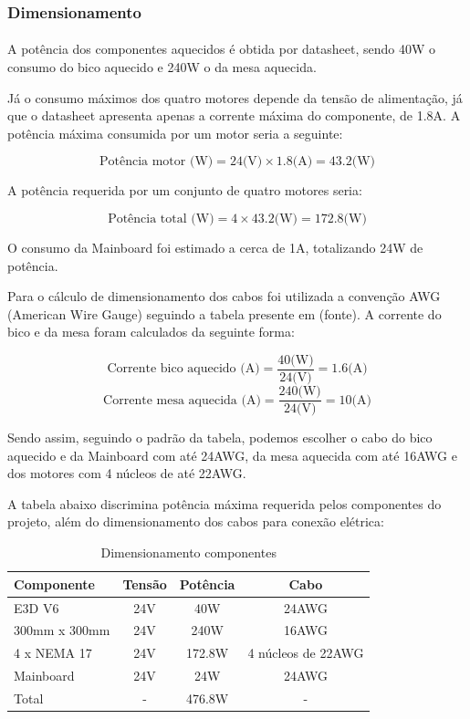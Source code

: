 \documentclass[12pt, english]{article}
\begin{document}
\subsubsection{Dimensionamento}

\paragraph{}
A potência dos componentes aquecidos é obtida por datasheet, sendo 40W o consumo do bico aquecido e 240W o da mesa aquecida.

Já o consumo máximos dos quatro motores depende da tensão de alimentação, já que o datasheet apresenta apenas a corrente máxima do componente, de 1.8A. A potência máxima consumida por um motor seria a seguinte: 

\[\textrm{Potência motor (W)} = 24\textrm{(V)} \times 1.8\textrm{(A)} = 43.2\textrm{(W)}\]

A potência requerida por um conjunto de quatro motores seria:

\[\textrm{Potência total (W)} = 4 \times 43.2\textrm{(W)} = 172.8\textrm{(W)}\]

O consumo da Mainboard foi estimado a cerca de 1A, totalizando 24W de potência.


Para o cálculo de dimensionamento dos cabos foi utilizada a convenção AWG (American Wire Gauge) seguindo a tabela presente em (fonte). A corrente do bico e da mesa foram calculados da seguinte forma:

\[\textrm{Corrente bico aquecido (A)} = \dfrac{40\textrm{(W)}}{24\textrm{(V)}} = 1.6\textrm{(A)}\]
\[\textrm{Corrente mesa aquecida (A)} = \dfrac{240\textrm{(W)}}{24\textrm{(V)}} = 10\textrm{(A)}\]

Sendo assim, seguindo o padrão da tabela, podemos escolher o cabo do bico aquecido e da Mainboard com até 24AWG, da mesa aquecida com até  16AWG e dos motores com 4 núcleos de até 22AWG.

A tabela abaixo discrimina potência máxima requerida pelos componentes do projeto, além do dimensionamento dos cabos para conexão elétrica:

\begin{table}[htbp]
	\centering
	\begin{tabular}{lccc}
		\toprule
		\textbf{Componente} & \textbf{Tensão} & \textbf{Potência} & \textbf{Cabo}\\
		\midrule
		E3D V6 & 24V & 40W & 24AWG\\
		300mm x 300mm & 24V & 240W & 16AWG\\
		4 x NEMA 17 & 24V & 172.8W & 4 núcleos de 22AWG\\
		Mainboard & 24V & 24W & 24AWG\\
		\addlinespace
		\midrule
		Total & - & 476.8W & -\\
		\bottomrule
	\end{tabular}
	\caption{Dimensionamento componentes}
\end{table}
\end{document}

